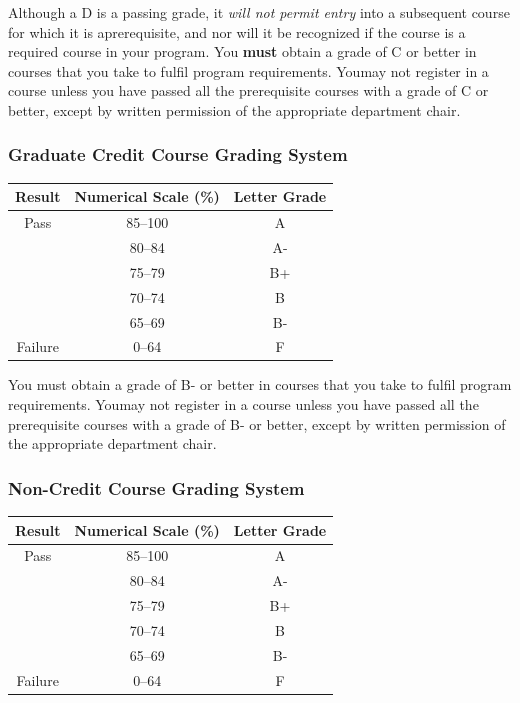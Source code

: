 \documentclass{article}
\begin{document}
Although a D is a passing grade, it {\em will not permit entry} into a
subsequent course for which it is aprerequisite, and nor will it be
recognized if the course is a required course in your program. You
{\bf must} obtain a grade of C or better in courses that you take to
fulfil program requirements. Youmay not register in a course unless
you have passed all the prerequisite courses with a grade of C or
better, except by written permission of the appropriate department
chair.

\subsubsection{Graduate Credit Course Grading System}


\begin{center}
  \begin{tabular}{ccc}
     Result & Numerical Scale (\%) & Letter Grade \\
   \hline
Pass & 85--100 & A  \\
& 80--84 & A- \\
& 75--79 & B+ \\
& 70--74 & B \\
& 65--69 & B- \\
Failure & 0--64 & F
  \end{tabular}
  \end{center}

You must obtain a grade of B- or better in courses that you take to
fulfil program requirements. Youmay not register in a course unless you
have passed all the prerequisite courses with a grade of B- or better,
except by written permission of the appropriate department chair.

\subsubsection{Non-Credit Course Grading System}

\begin{center}
  \begin{tabular}{ccc}
     Result & Numerical Scale (\%) & Letter Grade \\
   \hline
Pass & 85--100 & A  \\
& 80--84 & A- \\
& 75--79 & B+ \\
& 70--74 & B \\
& 65--69 & B- \\
Failure & 0--64 & F
  \end{tabular}
  \end{center}
\end{document}
